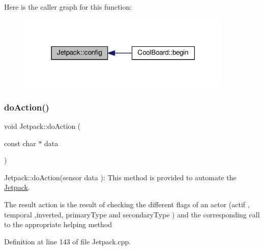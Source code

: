 Here is the caller graph for this function\+:\nopagebreak
\begin{figure}[H]
\begin{center}
\leavevmode
\includegraphics[width=291pt]{df/d1d/class_jetpack_ab065ee83e244265a2223a22f3ee4a719_icgraph}
\end{center}
\end{figure}
\mbox{\label{class_jetpack_a9e703197093094b963f9ad57817495b8}} 
\subsubsection{\texorpdfstring{do\+Action()}{doAction()}}
{\footnotesize\ttfamily void Jetpack\+::do\+Action (\begin{DoxyParamCaption}\item[{const char $\ast$}]{data }\end{DoxyParamCaption})}

Jetpack\+::do\+Action(sensor data )\+: This method is provided to automate the \hyperlink{class_jetpack}{Jetpack}.

The result action is the result of checking the different flags of an actor (actif , temporal ,inverted, primary\+Type and secondary\+Type ) and the corresponding call to the appropriate helping method 

Definition at line 143 of file Jetpack.\+cpp.


